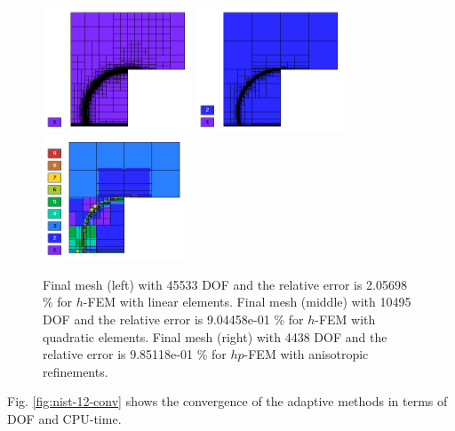 \documentclass[12pt]{elsarticle}
\begin{document}
\begin{figure}[H]
\centering
\vspace{-3mm}
\includegraphics[height=3.7cm]{nist/nist-12/mesh_h1_aniso.png}
\includegraphics[height=3.7cm]{nist/nist-12/mesh_h2_aniso.png}
\includegraphics[height=3.7cm]{nist/nist-12/mesh_hp_aniso.png}
\vspace{-3mm}
\caption{
Final mesh (left) with 45533 DOF and the relative error is 2.05698 \% for $h$-FEM with linear elements.
Final mesh (middle) with 10495 DOF and the relative error is 9.04458e-01 \% for $h$-FEM with quadratic elements.
Final mesh (right) with 4438 DOF and the relative error is 9.85118e-01 \% for $hp$-FEM with anisotropic refinements.}
\vspace{-3mm}
\label{fig:nist-12-hp-aniso}
\end{figure}

Fig. \ref{fig:nist-12-conv} shows the convergence of the adaptive methods in terms of DOF and CPU-time.
\end{document}
